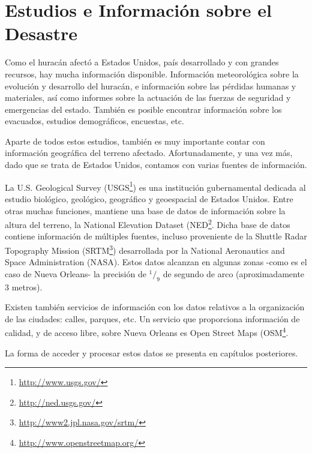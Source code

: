 \section{Estudios e Información sobre el Desastre}

Como el huracán afectó a Estados Unidos, país desarrollado y con grandes
recursos, hay mucha información disponible. Información meteorológica sobre la
evolución y desarrollo del huracán\cite{Blake07}, e información sobre las
pérdidas humanas y materiales\cite{Knabb05}\cite{Gabe05}, así como informes
sobre la actuación de las fuerzas de seguridad y emergencias del
estado\cite{DeLozier}. También es posible encontrar información sobre los
evacuados\cite{Groen08}, estudios demográficos\cite{McCarthy06},
encuestas\cite{Washington05}, etc.

Aparte de todos estos estudios, también es muy importante contar con
información geográfica del terreno afectado. Afortunadamente, y una vez más,
dado que se trata de Estados Unidos, contamos con varias fuentes de información.

La U.S. Geological Survey (USGS\footnote{\url{http://www.usgs.gov/}}) es una
institución gubernamental dedicada al estudio biológico, geológico, geográfico y
geoespacial de Estados Unidos. Entre otras muchas funciones, mantiene una base
de datos de información sobre la altura del terreno, la National Elevation
Dataset (NED\footnote{\url{http://ned.usgs.gov/}}. Dicha base de datos contiene
información de múltiples fuentes, incluso proveniente de la Shuttle Radar
Topography Mission (SRTM\footnote{\url{http://www2.jpl.nasa.gov/srtm/}})
desarrollada por la National Aeronautics and Space Administration (NASA). Estos
datos alcanzan en algunas zonas -como es el caso de Nueva Orleans- la precisión
de $^1/_9$ de segundo de arco (aproximadamente 3 metros).

Existen también servicios de información con los datos relativos a la
organización de las ciudades: calles, parques, etc. Un servicio que proporciona
información de calidad, y de acceso libre, sobre Nueva Orleans es Open Street
Maps (OSM\footnote{\url{http://www.openstreetmap.org/}}.

La forma de acceder y procesar estos datos se presenta en capítulos posteriores.

